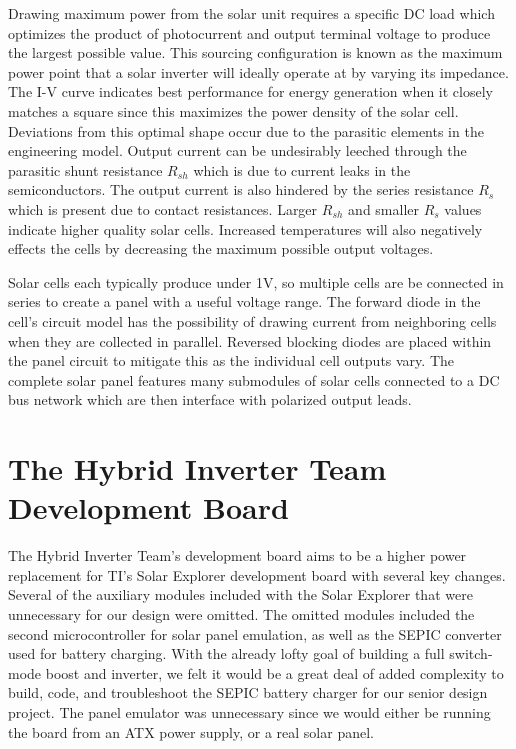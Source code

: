 Drawing maximum power from the solar unit requires a specific DC load which optimizes the product of photocurrent and output terminal voltage to produce the largest possible value. This sourcing configuration is known as the maximum power point that a solar inverter will ideally operate at by varying its impedance. The I-V curve indicates best performance for energy generation when it closely matches a square since this maximizes the power density of the solar cell. Deviations from this optimal shape occur due to the parasitic elements in the engineering model. Output current can be undesirably leeched through the parasitic shunt resistance $R_{sh}$ which is due to current leaks in the semiconductors. The output current is also hindered by the series resistance $R_{s}$ which is present due to contact resistances. Larger $R_{sh}$ and smaller $R_{s}$ values indicate higher quality solar cells. Increased temperatures will also negatively effects the cells by decreasing the maximum possible output voltages.

Solar cells each typically produce under 1V, so multiple cells are be connected in series to create a panel with a useful voltage range. The forward diode in the cell's circuit model has the possibility of drawing current from neighboring cells when they are collected in parallel. Reversed blocking diodes are placed within the panel circuit to mitigate this as the individual cell outputs vary. The complete solar panel features many submodules of solar cells connected to a DC bus network which are then interface with polarized output leads.

\section{The Hybrid Inverter Team Development Board}
The Hybrid Inverter Team's development board aims to be a higher power replacement for TI's Solar Explorer development board with several key changes. Several of the auxiliary modules included with the Solar Explorer that were unnecessary for our design were omitted. The omitted modules included the second microcontroller for solar panel emulation, as well as the SEPIC converter used for battery charging. With the already lofty goal of building a full switch-mode boost and inverter, we felt it would be a great deal of added complexity to build, code, and troubleshoot the SEPIC battery charger for our senior design project. The panel emulator was unnecessary since we would either be running the board from an ATX power supply, or a real solar panel.

